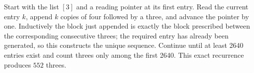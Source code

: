Start with the list $[3]$ and a reading pointer at its first entry. Read the current entry $k$, append $k$ copies of four followed by a three, and advance the pointer by one. Inductively the block just appended is exactly the block prescribed between the corresponding consecutive threes; the required entry has already been generated, so this constructs the unique sequence. Continue until at least 2640 entries exist and count threes only among the first 2640. This exact recurrence produces $\boxed{552}$ threes.
